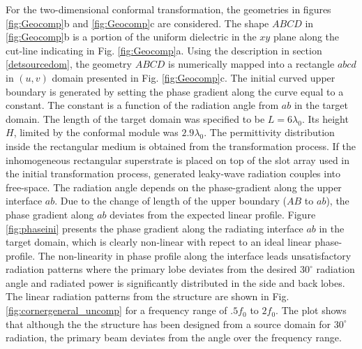 For the two-dimensional conformal transformation, the geometries in figures \ref{fig:Geocomp}b and \ref{fig:Geocomp}c are considered. The shape $ABCD$ in \ref{fig:Geocomp}b is a portion of the uniform dielectric in the $xy$ plane along the cut-line indicating in Fig. \ref{fig:Geocomp}a. Using the description in section \ref{detsourcedom}, the geometry $ABCD$ is numerically mapped into a rectangle $abcd$ in $(u,v)$ domain presented in Fig. \ref{fig:Geocomp}c. The initial curved upper boundary is generated by setting the phase gradient along the curve equal to a constant. The constant is a function of the radiation angle from $ab$ in the target domain. The length of the target domain was specified to be $L = 6 \lambda_0$. Its height $H$, limited by the conformal module was $2.9 \lambda_0$. The permittivity distribution inside the rectangular medium is obtained from the transformation process. If the inhomogeneous rectangular superstrate is placed on top of the slot array used in the initial transformation process, generated leaky-wave radiation couples into free-space. The radiation angle depends on the phase-gradient along the upper interface $ab$. Due to the change of length of the upper boundary ($AB$ to $ab$), the phase gradient along $ab$ deviates from the expected linear profile. Figure \ref{fig:phaseini} presents the phase gradient along the radiating interface $ab$ in the target domain, which is clearly non-linear with repect to an ideal linear phase-profile. The non-linearity in phase profile along the interface leads unsatisfactory radiation patterns where the primary lobe deviates from the desired $30^\circ$ radiation angle and radiated power is significantly distributed in the side and back lobes. The linear radiation patterns from the structure are shown in Fig. \ref{fig:cornergeneral_uncomp} for a frequency range of $.5f_0$ to $2f_0$. The plot shows that although the the structure has been designed from a source domain for $30^\circ$ radiation, the primary beam deviates from the angle over the frequency range. 

